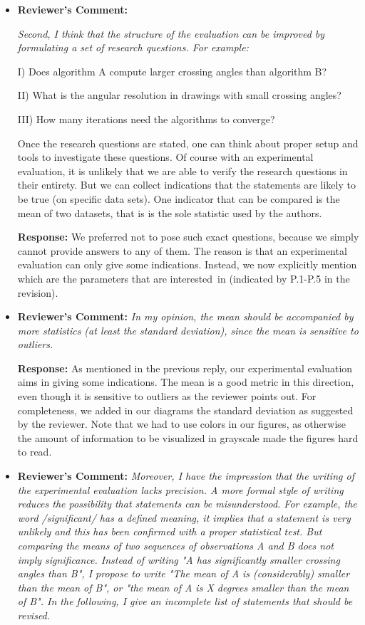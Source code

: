 \documentclass{article}
\newcommand{\rcomment}[1]{\vspace{0.3cm} \item \textbf{Reviewer's Comment:} {\em #1}}
\newcommand{\response}{\vspace{0.2cm} \textbf{Response: }}
\begin{document}
\begin{itemize}
\response{References [1-6] have been added as related work.}

\rcomment{Second, I think that the structure of the evaluation can be improved by formulating a set of research questions. For example:

I) Does algorithm A compute larger crossing angles than algorithm B?

II) What is the angular resolution in drawings with small crossing angles?

III) How many iterations need the algorithms to converge?

Once the research questions are stated, one can think about proper setup and tools to investigate these questions. Of course with an experimental evaluation, it is unlikely that we are able to verify the research questions in their entirety. But we can collect indications that the statements are likely to be true (on specific data sets). One indicator that can be compared is the mean of two datasets, that is is the sole statistic used by the authors.}

\response{We preferred not to pose such exact questions, because we simply cannot provide answers to any of them. The reason is that an experimental evaluation can only give some indications. Instead, we now explicitly mention which are the parameters that are interested~in (indicated by P.1-P.5 in the revision).}

\rcomment{In my opinion, the mean should be accompanied by more statistics (at least the standard deviation), since the mean is sensitive to outliers.}

\response{As mentioned in the previous reply, our experimental evaluation aims in giving some indications. The mean is a good metric in this direction, even though it is sensitive to outliers as the reviewer points out. For completeness, we added in our diagrams the standard deviation as suggested by the reviewer. Note that we had to use colors in our figures, as otherwise the amount of information to be visualized in grayscale made the figures hard to read.}

\rcomment{Moreover, I have the impression that the writing of the experimental evaluation lacks precision. A more formal style of writing reduces the possibility that statements can be misunderstood. For example, the word /significant/ has a defined meaning, it implies that a statement is very unlikely and this has been confirmed with a proper statistical test. But comparing the means of two sequences of observations A and B does not imply significance. Instead of writing "A has significantly smaller crossing angles than B", I propose to write "The mean of A is (considerably) smaller than the mean of B", or "the mean of A is X degrees smaller than the mean of B". In the following, I give an incomplete list of statements that should be revised.}


\end{itemize}
\end{document}
